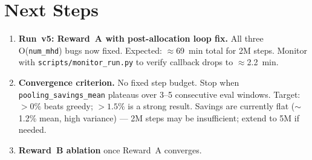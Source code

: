 \documentclass[11pt]{article}
\begin{document}
\section{Next Steps}

\begin{enumerate}
  \item \textbf{Run~v5: Reward~A with post-allocation loop fix.}
        All three O(\texttt{num\_mhd}) bugs now fixed.
        Expected: $\approx$69~min total for 2M steps.
        Monitor with \texttt{scripts/monitor\_run.py} to verify callback drops
        to $\approx$2.2~min.

  \item \textbf{Convergence criterion.} No fixed step budget.
        Stop when \texttt{pooling\_savings\_mean} plateaus over
        3--5 consecutive eval windows.
        Target: $>0\%$ beats greedy; $>1.5\%$ is a strong result.
        Savings are currently flat ($\sim$1.2\% mean, high variance) ---
        2M steps may be insufficient; extend to 5M if needed.

  \item \textbf{Reward~B ablation} once Reward~A converges.
\end{enumerate}
\end{document}
